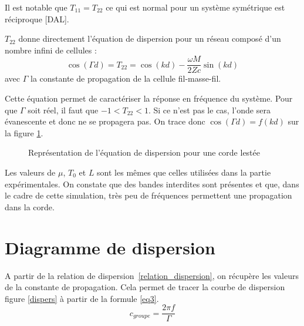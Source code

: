 \documentclass[a4paper,11pt]{report} %
\begin{document}
Il est notable que $T_{11} = T_{22}$ ce qui est normal pour un système symétrique est réciproque [DAL].


$T_{22}$ donne directement l'équation de dispersion pour un réseau composé d'un nombre infini de cellules : 
\begin{equation}\label{relation_dispersion}
	\cos(\Gamma d) = T_{22} = \cos(kd) - \frac{\omega M}{2 Zc}\sin(kd)
\end{equation}
avec $\Gamma$ la constante de propagation de la cellule fil-masse-fil.

Cette équation permet de caractériser la réponse en fréquence du système.
Pour que $\Gamma $ soit réel, il faut que $ -1 < T_{22} <1$. Si ce n'est pas le cas, l'onde sera évanescente et donc ne se propagera pas.
On trace donc $\cos(\Gamma d) = f(kd)$ sur la figure \ref{cordel_graphic1}.

\begin{figure}[!h]
\caption{\label{cordel_graphic1} Représentation de l'équation de dispersion pour une corde lestée}
\end{figure}

Les valeurs de $\mu$, $T_0$ et $L$ sont les mêmes que celles utilisées dans la partie expérimentales.
On constate que des bandes interdites sont présentes et que, dans le cadre de cette simulation, très peu de fréquences permettent une propagation dans la corde.

\section{Diagramme de dispersion}
A partir de la relation de dispersion~\ref{relation_dispersion}, on récupère les valeurs de la constante de propagation. Cela permet de tracer la courbe de dispersion figure \ref{dispers} à partir de la formule \ref{eq3}.
\begin{equation}\label{eq3}
c_{groupe} = \frac{2\pi f}{\Gamma}
\end{equation}
\end{document}
